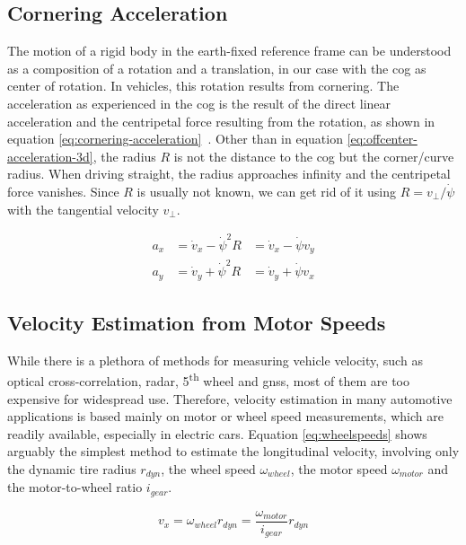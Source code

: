 \subsection{Cornering Acceleration}\label{sec:background-cornering-acceleration}
The motion of a rigid body in the earth-fixed reference frame can be understood as a composition of a rotation and a translation, in our case with the \gls{cog} as center of rotation. In vehicles, this rotation results from cornering. The acceleration as experienced in the \gls{cog} is the result of the direct linear acceleration and the centripetal force resulting from the rotation, as shown in equation \ref{eq:cornering-acceleration}~\cite[p.~146]{Milliken.1996}. Other than in equation \ref{eq:offcenter-acceleration-3d}, the radius $R$ is not the distance to the \gls{cog} but the corner/curve radius. When driving straight, the radius approaches infinity and the centripetal force vanishes. Since $R$ is usually not known, we can get rid of it using $R = v_{\perp} / \dot{\psi}$ with the tangential velocity $v_{\perp}$.

\begin{subequations}\label{eq:cornering-acceleration}
\begin{alignat}{3}%
a_x &= \dot{v}_x - \dot{\psi}^2 R &= \dot{v}_x - \dot{\psi}v_y \\%
a_y &= \dot{v}_y + \dot{\psi}^2 R &= \dot{v}_y + \dot{\psi}v_x%
\end{alignat}
\end{subequations}


\subsection{Velocity Estimation from Motor Speeds}\label{sec:motorspeeds-to-velocity}
While there is a plethora of methods for measuring vehicle velocity, such as optical cross-correlation, radar, 5\textsuperscript{th} wheel and \gls{gnss}, most of them are too expensive for widespread use. Therefore, velocity estimation in many automotive applications is based mainly on motor or wheel speed measurements, which are readily available, especially in electric cars. Equation \ref{eq:wheelspeeds} shows arguably the simplest method to estimate the longitudinal velocity, involving only the dynamic tire radius $r_{dyn}$, the wheel speed $\omega_{wheel}$, the motor speed $\omega_{motor}$ and the motor-to-wheel ratio $i_{gear}$.

\begin{equation}\label{eq:wheelspeeds}%
v_x = \omega_{wheel} r_{dyn} = \frac{\omega_{motor}}{i_{gear}} r_{dyn}%
\end{equation}

